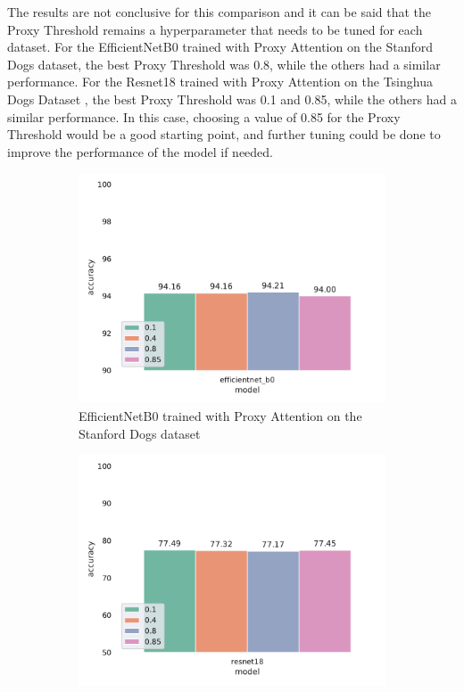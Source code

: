 The results are not conclusive for this comparison and it can be said that the Proxy Threshold remains a hyperparameter that needs to be tuned for each dataset.
For the EfficientNetB0 \cite{tanEfficientnetRethinkingModel2019} trained with Proxy Attention on the Stanford Dogs dataset\cite{khoslaNovelDatasetFineGrained}, the best Proxy Threshold was 0.8, while the others had a similar performance. For the Resnet18 \cite{heDeepResidualLearning2016} trained with Proxy Attention on the Tsinghua Dogs Dataset \cite{zouNewDatasetDog2020}, the best Proxy Threshold was 0.1 and 0.85, while the others had a similar performance.
In this case, choosing a value of 0.85 for the Proxy Threshold would be a good starting point, and further tuning could be done to improve the performance of the model if needed.

\begin{figure}[!htb]
    \begin{subfigure}[h]{.5\textwidth}
        \includegraphics[width=\linewidth, right]{results/proxy_threshold_results.pdf}
        \caption{EfficientNetB0 \cite{tanEfficientnetRethinkingModel2019} trained with Proxy Attention on the Stanford Dogs dataset\cite{khoslaNovelDatasetFineGrained}}
    \end{subfigure}
    \begin{subfigure}[h]{.5\textwidth}
        \includegraphics[width=\linewidth, left]{results/proxy_threshold_results_tsing.pdf}

\end{subfigure}
\end{figure}
